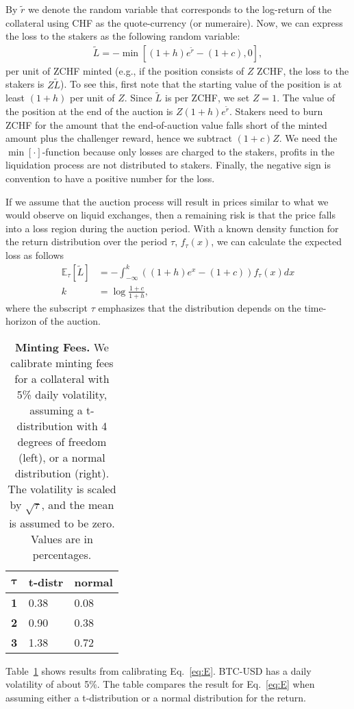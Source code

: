\documentclass[english,11pt]{article}
\begin{document}
By $\tilde{r}$ we denote the random variable that corresponds to the log-return of the collateral using CHF as the quote-currency (or numeraire).
Now, we can express the loss to the stakers as the following random variable:
\begin{align}
\tilde{L} = -\min\left[(1 + h) e^{\tilde{r}} - (1+c), 0\right],
\end{align}
per unit of ZCHF minted (e.g., if the position consists of $Z$ ZCHF, the loss to the stakers is $Z\tilde{L}$).
To see this, first note that the starting value of the position is at least $(1 + h)$ per unit of $Z$. Since $\tilde{L}$ is per ZCHF, we set $Z=1$.
The value of the position
at the end of the auction is $Z(1 + h) e^{\tilde{r}}$. Stakers need to burn ZCHF for the amount that the end-of-auction value falls short
of the minted amount plus the challenger reward, hence we subtract $(1+c)Z$. We need the $\min[\cdot]$-function because
only losses are charged to the stakers, profits in the liquidation process are not distributed to stakers. Finally, the negative sign is 
convention to have a positive number for the loss.

If we assume that the auction process will result in prices similar to what we would observe on liquid exchanges,
then a remaining risk is that the price falls into a loss region during the auction period.
With a known density function for the return distribution over the period $\tau$, $f_{\tau}(x)$, we can calculate the expected loss as follows
\begin{align}
\mathbb{E}_{\tau}\left[\tilde{L} \right] &= - \int_{-\infty}^k \left((1 + h) e^{x} - (1+c) \right) f_{\tau}(x) dx\label{eq:E}\\
k &= \log \frac{1+c}{1+h},
\end{align}
where the subscript $\tau$ emphasizes that the distribution depends on the time-horizon of the auction.

\begin{table}[]
\caption{\textbf{Minting Fees.}
    We calibrate minting fees for a collateral with 5\% daily volatility,
    assuming a t-distribution with 4 degrees of freedom (left), or a normal
    distribution (right). The volatility is scaled by $\sqrt{\tau}$, and the
    mean is assumed to be zero. Values are in percentages.} %
	\begin{center}
	\begin{tabular}{lll}
	\hline
	\textbf{$\mathbf{\tau}$} & \textbf{t-distr} & \textbf{normal} \\
	\hline
	\textbf{1}                   & 0.38             & 0.08            \\
	\textbf{2}                   & 0.90             & 0.38            \\
	\textbf{3}                   & 1.38             & 0.72   \\        
	\hline
	\end{tabular}
	\label{tab:calibration}
	\end{center}
\end{table}

Table~\ref{tab:calibration} shows results
from calibrating Eq.~\eqref{eq:E}. BTC-USD has a daily volatility of about 5\%. 
The table compares the result for Eq.~\eqref{eq:E} when assuming
either a t-distribution or a normal distribution for the return.
\end{document}

